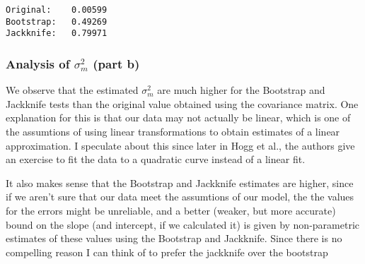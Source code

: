 \documentclass[11pt]{article}
\begin{document}
    \begin{Verbatim}[commandchars=\\\{\}]
Original:	 0.00599
Bootstrap:	 0.49269
Jackknife:	 0.79971

    \end{Verbatim}

    \hypertarget{analysis-of-sigma_m2-part-b}{%
\subsubsection{\texorpdfstring{Analysis of \(\sigma_m^2\) (part
\textbf{b})}{Analysis of \textbackslash{}sigma\_m\^{}2 (part b)}}\label{analysis-of-sigma_m2-part-b}}

We observe that the estimated \(\sigma_m^2\) are much higher for the
Bootstrap and Jackknife tests than the original value obtained using the
covariance matrix. One explanation for this is that our data may not
actually be linear, which is one of the assumtions of using linear
transformations to obtain estimates of a linear approximation. I
speculate about this since later in Hogg et al., the authors give an
exercise to fit the data to a quadratic curve instead of a linear fit.

It also makes sense that the Bootstrap and Jackknife estimates are
higher, since if we aren't sure that our data meet the assumtions of our
model, the the values for the errors might be unreliable, and a better
(weaker, but more accurate) bound on the slope (and intercept, if we
calculated it) is given by non-parametric estimates of these values
using the Bootstrap and Jackknife. Since there is no compelling reason I
can think of to prefer the jackknife over the bootstrap
\end{document}

